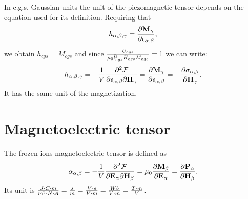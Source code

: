 \documentclass[12pt,a4paper]{article}
\begin{document}
{\color{orange} In c.g.s.-Gaussian units the unit of the piezomagnetic 
tensor depends on the equation used for its definition.
Requiring that
\begin{equation}
h_{\alpha,\beta,\gamma}={\partial {\bf M}_{\gamma} \over \partial 
\epsilon_{\alpha,\beta}},
\end{equation}
we obtain
$\bar h_{cgs}=\bar M_{cgs}$ and since 
${\bar U_{cgs} \over \mu_0 \bar l_{cgs}^3 \bar H_{cgs} \bar M_{cgs}}=
1$ we can write:
\begin{equation}
h_{\alpha,\beta,\gamma}=-{1\over V} 
{\partial^2 \mathcal{F} \over \partial 
\epsilon_{\alpha,\beta} \partial {\bf H}_{\gamma}}=
{\partial {\bf M}_{\gamma} \over \partial 
\epsilon_{\alpha,\beta}}=-
{\partial \sigma_{\alpha,\beta} \over \partial {\bf H}_{\gamma}}.
\end{equation}
It has the same unit of the magnetization.
}
\\

\newpage
\section{\color{coral}Magnetoelectric tensor}
The frozen-ions magnetoelectric tensor is defined as
\begin{equation}
\alpha_{\alpha,\beta}=-{1\over V} {\partial^2 \mathcal{F} \over \partial 
{\bf E}_{\alpha} \partial {\bf H}_{\beta}}=
\mu_0 {\partial {\bf M}_{\beta} \over \partial {\bf E}_{\alpha}}
={\partial {\bf P}_{\alpha} \over \partial {\bf H}_{\beta}}. 
\end{equation}
Its unit is ${J \cdot C \cdot m \over m^3 \cdot N \cdot A}={s \over m}=
{V \cdot s \over V\cdot m}= {Wb \over V\cdot m} = {T \cdot m \over V}$.
\\
\end{document}
